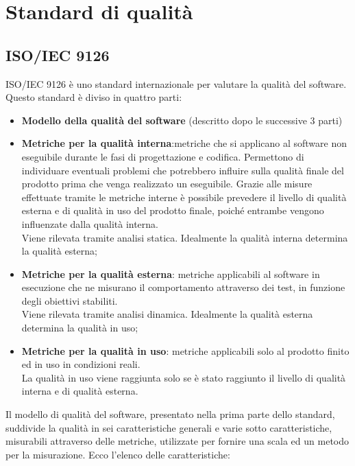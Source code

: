 \section{Standard di qualità}

	\subsection{ISO/IEC 9126}
	ISO/IEC 9126 è uno standard internazionale per valutare la qualità del software.\\%
	Questo standard è diviso in quattro parti:
	\begin{itemize}
		\item \textbf{Modello della qualità del software} (descritto dopo le successive 3 parti)
		\item \textbf{Metriche per la qualità interna}:metriche che si applicano al software non eseguibile durante le fasi di progettazione e codifica. Permettono di individuare eventuali problemi che potrebbero influire sulla qualità finale del prodotto prima che venga realizzato un eseguibile. Grazie alle misure effettuate tramite le metriche interne è possibile prevedere il livello di qualità esterna e di qualità in uso del prodotto finale, poiché entrambe vengono influenzate dalla qualità interna.\\
Viene rilevata tramite analisi statica. Idealmente la qualità interna determina la qualità esterna;
		\item \textbf{Metriche per la qualità esterna}: metriche applicabili al software in esecuzione che ne misurano il comportamento attraverso dei test, in funzione degli obiettivi stabiliti.\\
Viene rilevata tramite analisi dinamica. Idealmente la qualità esterna determina la qualità in uso;
		\item \textbf{Metriche per la qualità in uso}: metriche applicabili solo al prodotto finito ed in uso in condizioni reali.\\
La qualità in uso viene raggiunta solo se è stato raggiunto il livello di qualità interna e di qualità esterna.
	\end{itemize}
	Il modello di qualità del software, presentato nella prima parte dello standard, suddivide la qualità in sei caratteristiche generali e varie sotto caratteristiche, misurabili attraverso delle metriche, utilizzate per fornire una scala ed un metodo per la misurazione. Ecco l'elenco delle caratteristiche:
